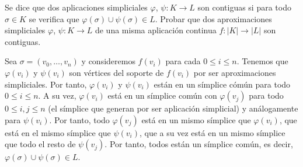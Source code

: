 \documentclass[twoside]{article}
\begin{document}
\newpage

\begin{ejercicio}{1.4}
Se dice que dos aplicaciones simpliciales $φ$, $ψ : K \to L$ son contiguas si para todo $σ \in K$ se verifica que $φ(σ) \cup ψ(σ) \in L$.
Probar que dos aproximaciones simpliciales $φ$, $ψ : K \to L$ de una misma aplicación continua $f : |K| \to |L|$ son contiguas.
\end{ejercicio}
\begin{solucion}
Sea $\sigma=(v_0,\dots, v_n)$ y consideremos $f(v_i)$ para cada $0\leq i\leq n$. Tenemos que $\varphi(v_i)$ y $\psi(v_i)$ son vértices del soporte de $f(v_i)$ por ser aproximaciones simpliciales. Por tanto, $\varphi(v_i)$ y $\psi(v_i)$ están en un símplice cómún para todo $0\leq i\leq n$. A su vez, $\varphi(v_i)$ está en un símplice común con $\varphi(v_j)$ para todo $0\leq i,j\leq n$ (el símplice que generan por ser aplicación simplicial) y análogamente para $\psi(v_i)$. Por tanto, todo $\varphi(v_j)$ está en un mismo símplice que $\varphi(v_i)$, que está en el mismo símplice que $\psi(v_i)$, que a su vez está en un mismo símplice que todo el resto de $\psi(v_j)$. Por tanto, todos están un símplice común, es decir,  $φ(σ) \cup ψ(σ) \in L$.
\end{solucion}

\newpage
\end{document}
